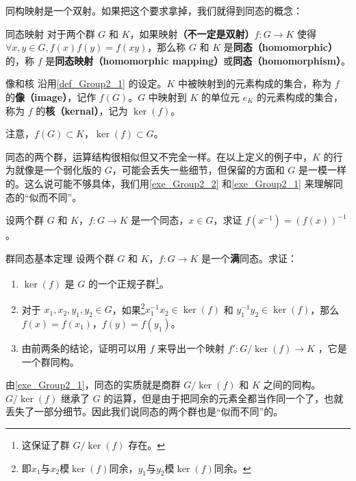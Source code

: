 同构映射是一个双射。如果把这个要求拿掉，我们就得到同态的概念：

\begin{definition}{同态映射}\label{def_Group2_1}
对于两个群 $G$ 和 $K$，如果映射\textbf{（不一定是双射）}$f:G\rightarrow K$ 使得 $\forall x, y\in G, f(x)f(y)=f(xy)$，那么称 $G$ 和 $K$ 是\textbf{同态（homomorphic）}的，称 $f$ 是\textbf{同态映射（homomorphic mapping）}或\textbf{同态（homomorphism）}。
\end{definition}

\begin{definition}{像和核}
沿用\autoref{def_Group2_1} 的设定。$K$ 中被映射到的元素构成的集合，称为 $f$ 的\textbf{像（image）}，记作 $f(G)$。$G$ 中映射到 $K$ 的单位元 $e_K$ 的元素构成的集合，称为 $f$ 的\textbf{核（kernal）}，记为 $\ker(f)$。
\end{definition}

注意，$f(G)\subset K$，$\ker(f)\subset G$。

同态的两个群，运算结构很相似但又不完全一样。在以上定义的例子中，$K$ 的行为就像是一个弱化版的 $G$，可能会丢失一些细节，但保留的方面和 $G$ 是一模一样的。这么说可能不够具体，我们用\autoref{exe_Group2_2} 和\autoref{exe_Group2_1} 来理解同态的“似而不同”。


\begin{exercise}{}\label{exe_Group2_2}
设两个群 $G$ 和 $K$，$f:G\rightarrow K$ 是一个同态，$x\in G$，求证 $f(x^{-1})=(f(x))^{-1}$。
\end{exercise}


\begin{exercise}{群同态基本定理}\label{exe_Group2_1}
设两个群 $G$ 和 $K$，$f:G\rightarrow K$ 是一个\textbf{满}同态。求证：
\begin{enumerate}
\item $\ker(f)$ 是 $G$ 的一个正规子群\footnote{这保证了群 $G/\ker(f)$ 存在。}。
\item 对于 $x_1, x_2, y_1, y_2\in G$，如果\footnote{即$x_1$与$x_2$模$\ker(f)$同余，$y_1$与$y_2$模$\ker(f)$同余。}$x_1^{-1}x_2\in \ker(f)$ 和 $y_1^{-1}y_2\in \ker(f)$，那么 $f(x)=f(x_1)$，$f(y)=f(y_1)$。
\item 由前两条的结论，证明可以用 $f$ 来导出一个映射 $f': G/\ker(f)\rightarrow K$ ，它是一个群同构。

\end{enumerate}
\end{exercise}

由\autoref{exe_Group2_1}，同态的实质就是商群 $G/\ker(f)$ 和 $K$ 之间的同构。$G/\ker(f)$ 继承了 $G$ 的运算，但是由于把同余的元素全都当作同一个了，也就丢失了一部分细节。因此我们说同态的两个群也是“似而不同”的。

